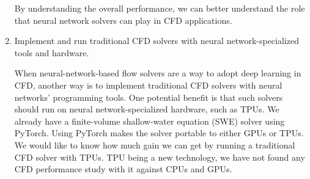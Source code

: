 \begin{enumerate}[label=Aim \arabic*]
        By understanding the overall performance, we can better understand the role that neural network solvers can play in CFD applications.

    \item Implement and run traditional CFD solvers with neural network-specialized tools and hardware.

        When neural-network-based flow solvers are a way to adopt deep learning in CFD, another way is to implement traditional CFD solvers with neural networks' programming tools.
        One potential benefit is that such solvers should run on neural network-specialized hardware, such as TPUs.
        We already have a finite-volume shallow-water equation (SWE) solver using PyTorch.
        Using PyTorch makes the solver portable to either GPUs or TPUs.
        We would like to know how much gain we can get by running a traditional CFD solver with TPUs.
        TPU being a new technology, we have not found any CFD performance study with it against CPUs and GPUs.

\end{enumerate}
